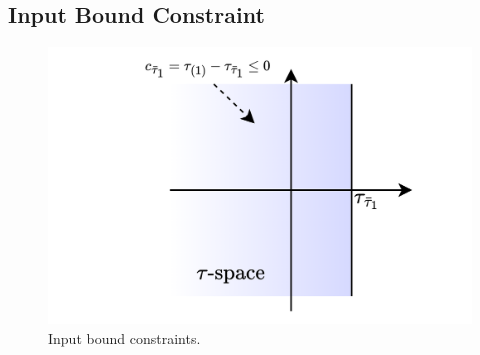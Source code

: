 
\subsection{Input Bound Constraint} \label{chap4:sec:input_cstr}

\begin{figure}[t]
    \centering
    \includegraphics[width=0.5\linewidth]{imgs/cstr_input_bound.drawio.png}
    \caption{Input bound constraints.}
    \label{chap4:fig:cstr:u_bound}
\end{figure}


